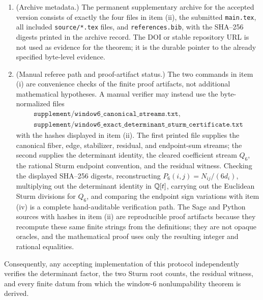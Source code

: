 \begin{proposition}
\begin{enumerate}[label=\textup{(\roman*)}]
\item \textup{(Archive metadata.)}  The permanent supplementary archive for the accepted version consists of exactly the four files in item \textup{(ii)}, the submitted \texttt{main.tex}, all included \texttt{source/*.tex} files, and \texttt{references.bib}, with the SHA--256 digests printed in the archive record.  The DOI or stable repository URL is not used as evidence for the theorem; it is the durable pointer to the already specified byte-level evidence.
\item \textup{(Manual referee path and proof-artifact status.)}  The two commands in item \textup{(i)} are convenience checks of the finite proof artifacts, not additional mathematical hypotheses.  A manual verifier may instead use the byte-normalized files
\[
\begin{gathered}
\texttt{supplement/window6\_canonical\_streams.txt},\\
\texttt{supplement/window6\_exact\_determinant\_sturm\_certificate.txt}
\end{gathered}
\]
with the hashes displayed in item \textup{(ii)}.  The first printed file supplies the canonical fiber, edge, stabilizer, residual, and endpoint-sum streams; the second supplies the determinant identity, the cleared coefficient stream \(Q_6\), the rational Sturm endpoint convention, and the residual witness.  Checking the displayed SHA--256 digests, reconstructing \(P_6(i,j)=N_{ij}/(6d_i)\), multiplying out the determinant identity in \(\mathbb{Q}[t]\), carrying out the Euclidean Sturm divisions for \(Q_6\), and comparing the endpoint sign variations with item \textup{(iv)} is a complete hand-auditable verification path.  The Sage and Python sources with hashes in item \textup{(ii)} are reproducible proof artifacts because they recompute these same finite strings from the definitions; they are not opaque oracles, and the mathematical proof uses only the resulting integer and rational equalities.
\end{enumerate}
Consequently, any accepting implementation of this protocol independently verifies the determinant factor, the two Sturm root counts, the residual witness, and every finite datum from which the window-\(6\) nonlumpability theorem is derived.
\end{proposition}

